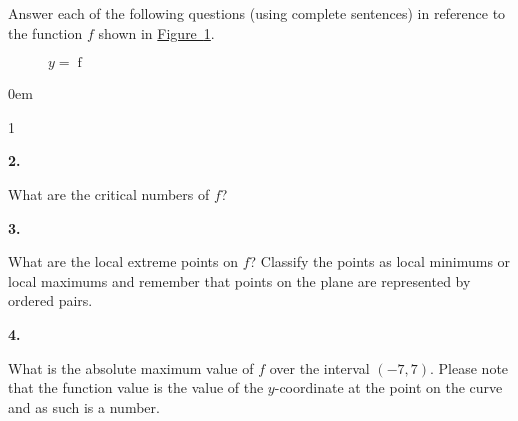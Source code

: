 \documentclass[12pt,]{book}
\theoremstyle{plain}
\theoremstyle{definition}
\numberwithin{equation}{section}
\newenvironment{exercisegroup}%
{\medskip\noindent}%
{\par\bigskip}%
\newlength{\exercisegroupindent}%
\newlength{\exercisegroupitemwidth}%
\newenvironment{exercisegrouplist}%
{\vspace{-\partopsep}%
\begin{adjustwidth}{\exercisegroupindent}{0em}}%
{\end{adjustwidth}%
\vspace{-\partopsep}%
\vspace{\baselineskip}}%
\newenvironment{exercisegroupbycol}[1]%
{\begin{exercisegrouplist}%
\vspace{-\multicolsep}%
\begin{multicols}{#1}%
\setlength{\parindent}{0em}%
\setlength{\exercisegroupitemwidth}{\linewidth}}%
{\end{multicols}%
\vspace{-\multicolsep}%
\end{exercisegrouplist}}%
\newenvironment{exercisegroupitem}[1]%
{\begin{minipage}[t]{\exercisegroupitemwidth}
\vspace{0pt}%
{\bfseries#1}%
\rule{0pt}{\baselineskip}}{\strut%
\end{minipage}%
\hspace{\columnsep}}%
\providecommand\phantomsection{}
\newcommand{\fe}[2]{\mathop{{#1}{\left(#2\right)}}}
\newcommand{\ointerval}[2]{\left(#1,#2\right)}
\begin{document}
\begin{exercisegroup}%
Answer each of the following questions (using complete sentences) in reference to the function \(f\) shown in \hyperref[figure-lots-of-critical-points]{Figure~\ref*{figure-lots-of-critical-points}}.%
\begin{figure}
\centering
{
}
\caption{\(y=\fe{f}{x}\)\label{figure-lots-of-critical-points}}
\end{figure}
\par
\begin{exercisegroupbycol}{1}%
\begin{exercisegroupitem}{2. }\phantomsection\hypertarget{exercise-395}{\null}
What are the critical numbers of \(f\)?%
\end{exercisegroupitem}%
\par%
\begin{exercisegroupitem}{3. }\phantomsection\hypertarget{exercise-396}{\null}
What are the local extreme points on \(f\)?  Classify the points as local minimums or local maximums and remember that points on the plane are represented by ordered pairs.%
\end{exercisegroupitem}%
\par%
\begin{exercisegroupitem}{4. }\phantomsection\hypertarget{exercise-397}{\null}
What is the absolute maximum value of \(f\) over the interval \(\ointerval{-7}{7}\).  Please note that the function value is the value of the \(y\)-coordinate at the point on the curve and as such is a number.%
\end{exercisegroupitem}%
\par%
\end{exercisegroupbycol}%
\end{exercisegroup}%
\end{document}

